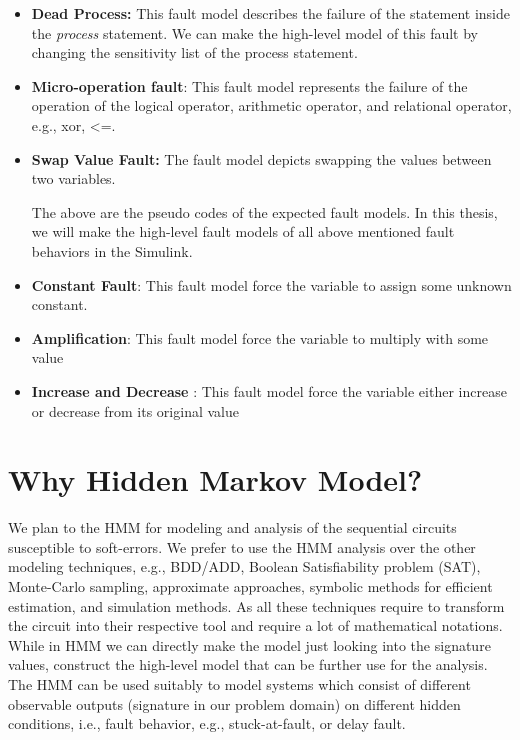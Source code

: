 \begin{itemize}
\item \textbf{Dead Process:} This fault model describes the failure of the statement inside the \textit{process} statement. We can make the high-level model of this fault by changing the sensitivity list of the process statement.







\item \textbf{Micro-operation fault}: This fault model represents the failure of the operation of the logical operator, arithmetic operator, and relational operator, e.g., xor, <=.   



\item \textbf{Swap Value Fault:} The fault model depicts  swapping the values between two variables.




The above are the pseudo codes of the expected fault models. In this thesis, we will make the high-level fault models of all above mentioned fault behaviors in the Simulink. 



\item \textbf{Constant Fault}: This fault model force the variable to assign some unknown constant.





\item \textbf{Amplification}: This fault model force the variable to multiply with some value




\item \textbf{Increase and Decrease }: This fault model force the variable either increase or decrease from its original value


\end{itemize}






\section{Why Hidden Markov Model?}


We plan to the HMM for modeling and analysis of the sequential circuits susceptible to soft-errors. We prefer to use the HMM analysis over the other modeling techniques, e.g., BDD/ADD, Boolean Satisfiability problem (SAT), Monte-Carlo sampling, approximate approaches, symbolic methods for efficient estimation, and simulation methods. As all these techniques require to transform the circuit into their respective tool and require a lot of mathematical notations. While in HMM we can directly make the model just looking into the signature values, construct the high-level model that can be further use for the analysis. The HMM can be used suitably to model systems which consist of different observable outputs (signature in our problem domain) on different hidden conditions, i.e., fault behavior, e.g., stuck-at-fault, or delay fault.

